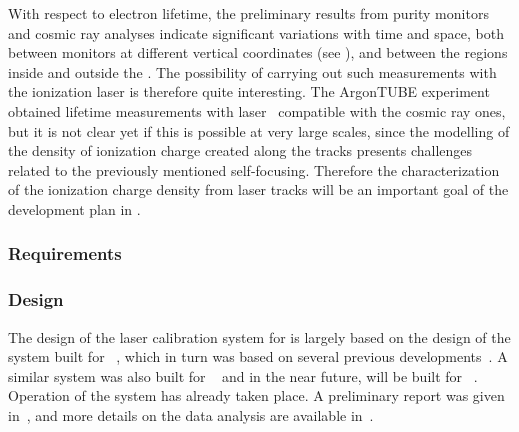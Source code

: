 
With respect to electron lifetime, the preliminary results from  purity monitors and cosmic ray analyses indicate significant variations with time and space, both between monitors at different vertical coordinates (see  \spchcisc), and between the regions inside and outside the . The possibility of carrying out such measurements with the ionization laser is therefore quite interesting. The ArgonTUBE experiment obtained lifetime measurements with laser~\cite{Ereditato:2013xaa} compatible with the cosmic ray ones, but it is not clear yet if this is possible at very large scales, since the modelling of the density of ionization charge created along the tracks presents challenges related to the previously mentioned self-focusing. Therefore the characterization of the ionization charge density from laser tracks will be an important goal of the development plan in .



\subsubsection{Requirements}
\label{sec:dp-calib-laser-req}



\subsubsection{Design}
\label{sec:sp-calib-sys-las-ion-des}

The design of the laser calibration system for  is largely based on the design of the system built for ~\cite{microboone}, which in turn was based on several previous developments~\cite{Rossi:2009im,Zeller:2013sva,Ereditato:2014lra,Ereditato:82014tya}. A similar system was also built for ~\cite{Berns:2013usa} and in the near future, will be built for ~\cite{Antonello:2015lea}. Operation of the  system has already taken place. A preliminary report was given in~\cite{bib:chen2018}, and more details on the data analysis are available in~\cite{bib:uBlaser2019}.


